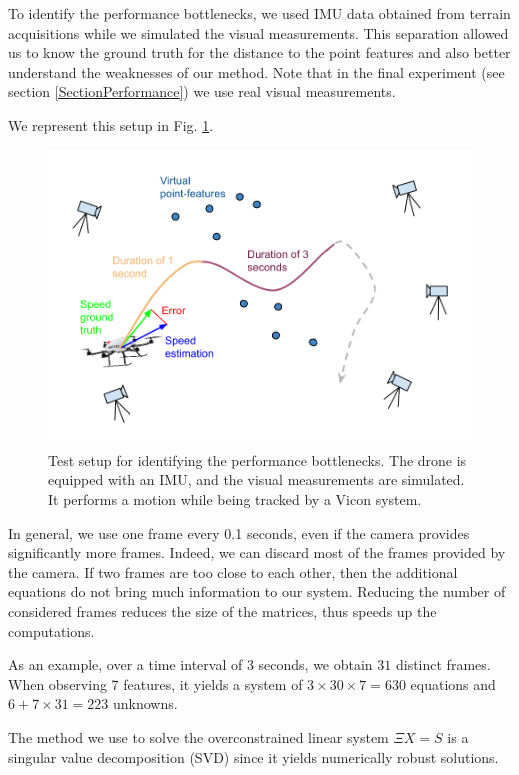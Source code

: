 \documentclass[letterpaper, 10 pt, conference]{ieeeconf}  %
\begin{document}
To identify the performance bottlenecks, we used IMU data obtained from terrain acquisitions
while we simulated the visual measurements.
This separation allowed us to know the ground truth for the distance to the point features
and also better understand the weaknesses of our method. Note that in the final experiment (see section \ref{SectionPerformance}) we use real visual measurements.

We represent this setup in Fig. \ref{fig:testsetup}.

\begin{figure}
  \centering
  \includegraphics[width=\columnwidth]{images/setupTestDroneError.png}
  \caption{Test setup for identifying the performance bottlenecks.
    The drone is equipped with an IMU, and the visual measurements are simulated.
    It performs a motion while being tracked by a Vicon system.\label{fig:testsetup}}
\end{figure}

In general, we use one frame every 0.1 seconds, even if the camera provides significantly more frames.
Indeed, we can discard most of the frames provided by the camera.
If two frames are too close to each other, then the additional equations do not bring much information to our system.
Reducing the number of considered frames reduces the size of the matrices, thus speeds up the computations.

As an example, over a time interval of 3 seconds, we obtain $31$ distinct frames.
When observing 7 features, it yields a system of $3\times 30\times 7 = 630$ equations and $6+7\times 31=223$ unknowns.

The method we use to solve the overconstrained linear system $\Xi X = S$ is a singular value decomposition (SVD) since it yields numerically robust solutions.
\end{document}
